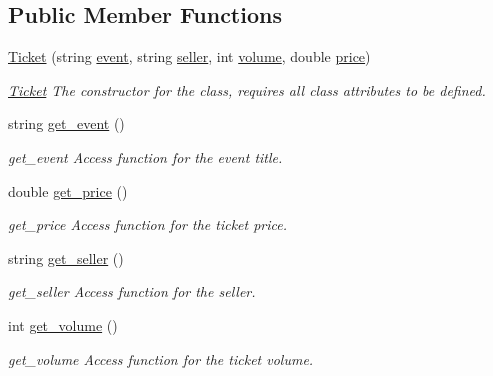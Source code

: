\subsection*{Public Member Functions}
\begin{DoxyCompactItemize}
\item 
\hyperlink{class_ticket_af7970b7b7045eed437759b1b16560c7c}{Ticket} (string \hyperlink{class_ticket_ae2d7d5c62721303e8a6fa492dc21a65f}{event}, string \hyperlink{class_ticket_a8cdc0977faad029fbb45ab09035319b9}{seller}, int \hyperlink{class_ticket_aed48ca0bcd2162fd4fd495873e2631f5}{volume}, double \hyperlink{class_ticket_a80d1e9b73edf0b6c8aa055cb5cdaa2f2}{price})
\begin{DoxyCompactList}\small\item\em \hyperlink{class_ticket}{Ticket} The constructor for the class, requires all class attributes to be defined. \end{DoxyCompactList}\item 
string \hyperlink{class_ticket_a7d92689260064db0b8263acbe3370271}{get\-\_\-event} ()
\begin{DoxyCompactList}\small\item\em get\-\_\-event Access function for the event title. \end{DoxyCompactList}\item 
double \hyperlink{class_ticket_a91c1ecd18b9ca25105da73692f04085e}{get\-\_\-price} ()
\begin{DoxyCompactList}\small\item\em get\-\_\-price Access function for the ticket price. \end{DoxyCompactList}\item 
string \hyperlink{class_ticket_a1a250452fb9bf26f05f98bfdf463bbe1}{get\-\_\-seller} ()
\begin{DoxyCompactList}\small\item\em get\-\_\-seller Access function for the seller. \end{DoxyCompactList}\item 
int \hyperlink{class_ticket_a48ce708d66cc141bd2fded62e66f2771}{get\-\_\-volume} ()
\begin{DoxyCompactList}\small\item\em get\-\_\-volume Access function for the ticket volume. \end{DoxyCompactList}\end{DoxyCompactItemize}
